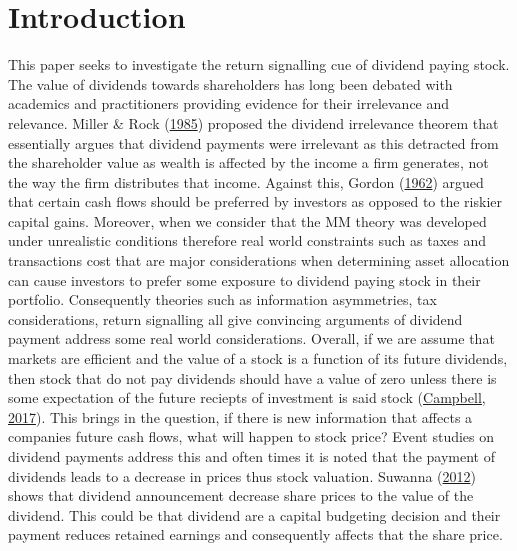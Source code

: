 \documentclass[12pt,preprint, authoryear]{elsarticle}
\numberwithin{equation}{section}
\numberwithin{figure}{section}
\numberwithin{table}{section}
\begin{document}

\headsep 35pt %




\newpage

\hypertarget{introduction}{%
\section{Introduction}\label{introduction}}

This paper seeks to investigate the return signalling cue of dividend
paying stock. The value of dividends towards shareholders has long been
debated with academics and practitioners providing evidence for their
irrelevance and relevance. Miller \& Rock
(\protect\hyperlink{ref-miller1985dividend}{1985}) proposed the dividend
irrelevance theorem that essentially argues that dividend payments were
irrelevant as this detracted from the shareholder value as wealth is
affected by the income a firm generates, not the way the firm
distributes that income. Against this, Gordon
(\protect\hyperlink{ref-gordon1962}{1962}) argued that certain cash
flows should be preferred by investors as opposed to the riskier capital
gains. Moreover, when we consider that the MM theory was developed under
unrealistic conditions therefore real world constraints such as taxes
and transactions cost that are major considerations when determining
asset allocation can cause investors to prefer some exposure to dividend
paying stock in their portfolio. Consequently theories such as
information asymmetries, tax considerations, return signalling all give
convincing arguments of dividend payment address some real world
considerations. Overall, if we are assume that markets are efficient and
the value of a stock is a function of its future dividends, then stock
that do not pay dividends should have a value of zero unless there is
some expectation of the future reciepts of investment is said stock
(\protect\hyperlink{ref-campbell2017financial}{Campbell, 2017}). This
brings in the question, if there is new information that affects a
companies future cash flows, what will happen to stock price? Event
studies on dividend payments address this and often times it is noted
that the payment of dividends leads to a decrease in prices thus stock
valuation. Suwanna (\protect\hyperlink{ref-suwanna2012impacts}{2012})
shows that dividend announcement decrease share prices to the value of
the dividend. This could be that dividend are a capital budgeting
decision and their payment reduces retained earnings and consequently
affects that the share price.
\end{document}
